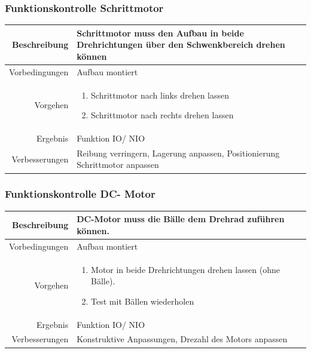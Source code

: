 \subsubsection{Funktionskontrolle Schrittmotor}
\begin{table}[h!]
	\renewcommand{\arraystretch}{1.5}
	\begin{tabular}{|r|p{14cm}|}
		\hline Beschreibung & Schrittmotor muss den Aufbau in beide Drehrichtungen über den Schwenkbereich drehen können  \\ 
		\hline Vorbedingungen & Aufbau montiert \\ 
		\hline Vorgehen & 
		\begin{enumerate}
			\item Schrittmotor nach links drehen lassen 
			\item Schrittmotor nach rechts drehen lassen
		\end{enumerate} \\ 
		\hline Ergebnis & Funktion IO/ NIO \\ 
		\hline Verbesserungen & Reibung verringern, Lagerung anpassen, Positionierung Schrittmotor anpassen \\ 
		\hline 
	\end{tabular}
\end{table}
\newpage

\subsubsection{Funktionskontrolle DC- Motor}
\begin{table}[h!]
	\renewcommand{\arraystretch}{1.5}
	\begin{tabular}{|r|p{14cm}|}
		\hline Beschreibung & DC-Motor muss die Bälle dem Drehrad zuführen können.  \\ 
		\hline Vorbedingungen & Aufbau montiert \\ 
		\hline Vorgehen & 
		\begin{enumerate}
			\item Motor in beide Drehrichtungen drehen lassen (ohne Bälle). 
			\item Test mit Bällen wiederholen
		\end{enumerate} \\ 
		\hline Ergebnis & Funktion IO/ NIO \\ 
		\hline Verbesserungen & Konstruktive Anpassungen, Drezahl des Motors anpassen \\ 
		\hline 
	\end{tabular}
\end{table}

